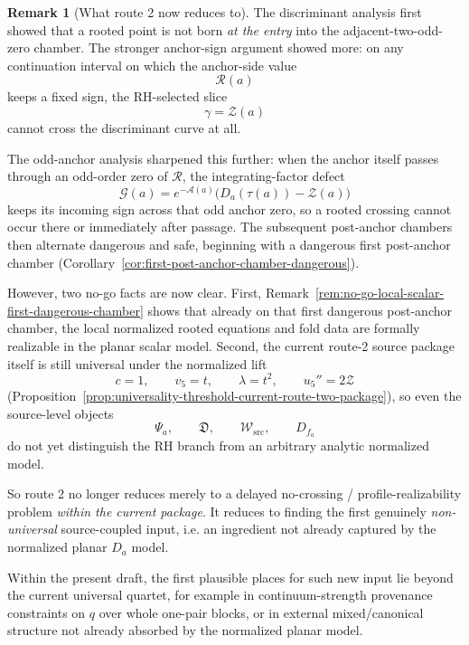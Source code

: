 \documentclass[11pt,a4paper]{amsart}
\theoremstyle{plain}
\theoremstyle{definition}
\newtheorem{remark}[theorem]{Remark}
\begin{document}
\begin{remark}[What route 2 now reduces to]
\label{rem:route-two-reduces-to-global-no-crossing}
The discriminant analysis first showed that a rooted point is not born
\emph{at the entry} into the adjacent-two-odd-zero chamber. The stronger
anchor-sign argument showed more: on any continuation interval on which the
anchor-side value
\[
\mathcal R(a)
\]
keeps a fixed sign, the RH-selected slice
\[
\gamma=\mathcal Z(a)
\]
cannot cross the discriminant curve at all.

The odd-anchor analysis sharpened this further: when the anchor itself passes
through an odd-order zero of $\mathcal R$, the integrating-factor defect
\[
\mathscr G(a)=e^{-\mathcal A(a)}\bigl(D_a(\tau(a))-\mathcal Z(a)\bigr)
\]
keeps its incoming sign across that odd anchor zero, so a rooted crossing cannot
occur there or immediately after passage. The subsequent post-anchor chambers
then alternate dangerous and safe, beginning with a dangerous first post-anchor
chamber
(Corollary~\ref{cor:first-post-anchor-chamber-dangerous}).

However, two no-go facts are now clear. First,
Remark~\ref{rem:no-go-local-scalar-first-dangerous-chamber} shows that already
on that first dangerous post-anchor chamber, the local normalized rooted
equations and fold data are formally realizable in the planar scalar model.
Second, the current route-2 source package itself is still universal under the
normalized lift
\[
c=1,\qquad v_5=t,\qquad \lambda=t^2,\qquad u_5''=2\mathcal Z
\]
(Proposition~\ref{prop:universality-threshold-current-route-two-package}),
so even the source-level objects
\[
\Psi_a,\qquad \mathfrak D,\qquad \mathcal W_{\mathrm{src}},\qquad D_{f_a}
\]
do not yet distinguish the RH branch from an arbitrary analytic normalized
model.

So route 2 no longer reduces merely to a delayed no-crossing /
profile-realizability problem \emph{within the current package}. It reduces to
finding the first genuinely \emph{non-universal} source-coupled input, i.e. an
ingredient not already captured by the normalized planar $D_a$ model.

Within the present draft, the first plausible places for such new input lie
beyond the current universal quartet, for example in continuum-strength
provenance constraints on $q$ over whole one-pair blocks, or in external
mixed/canonical structure not already absorbed by the normalized planar model.
\end{remark}
\end{document}
